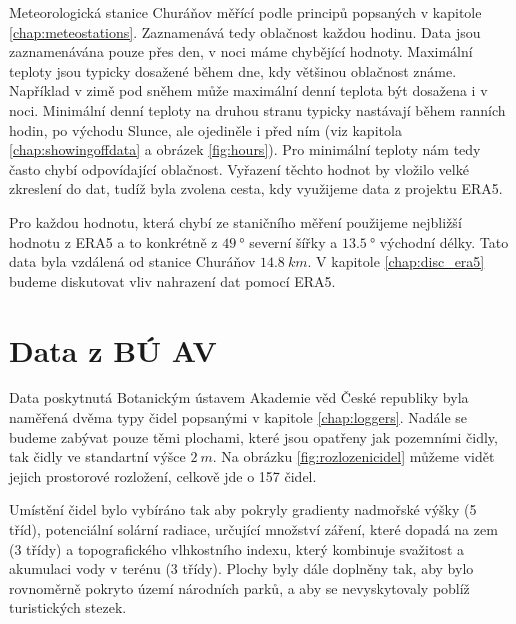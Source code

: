 Meteorologická stanice Churáňov měřící podle principů popsaných v kapitole \ref{chap:meteostations}. Zaznamenává tedy oblačnost každou hodinu. Data jsou zaznamenávána pouze přes den, v noci máme chybějící hodnoty. Maximální teploty jsou typicky dosažené během dne, kdy většinou oblačnost známe. Například v zimě pod sněhem může maximální denní teplota být dosažena i v noci. Minimální denní teploty na druhou stranu typicky nastávají během ranních hodin, po východu Slunce, ale ojediněle i před ním (viz kapitola \ref{chap:showingoffdata} a obrázek \ref{fig:hours}). Pro minimální teploty nám tedy často chybí odpovídající oblačnost. Vyřazení těchto hodnot by vložilo velké zkreslení do dat, tudíž byla zvolena cesta, kdy využijeme data z projektu ERA5.

Pro každou hodnotu, která chybí ze staničního měření použijeme nejbližší hodnotu z ERA5 a to konkrétně z $\SI{49}{\degree}$ severní šířky a $\SI{13.5}{\degree}$ východní délky. Tato data byla vzdálená od stanice Churáňov $\SI{14.8}{km}$. V kapitole \ref{chap:disc_era5} budeme diskutovat vliv nahrazení dat pomocí ERA5.

\section{Data z BÚ AV}\label{chap:data_buav}
Data poskytnutá Botanickým ústavem Akademie věd České republiky byla naměřená dvěma typy čidel popsanými v kapitole \ref{chap:loggers}. Nadále se budeme zabývat pouze těmi plochami, které jsou opatřeny jak pozemními čidly, tak čidly ve standartní výšce $\SI{2}{m}$. Na obrázku \ref{fig:rozlozenicidel} můžeme vidět jejich prostorové rozložení, celkově jde o 157 čidel. 

Umístění čidel bylo vybíráno tak aby pokryly gradienty nadmořské výšky (5 tříd), potenciální solární radiace, určující množství záření, které dopadá na zem (3 třídy) a topografického vlhkostního indexu, který kombinuje svažitost a akumulaci vody v terénu (3 třídy). Plochy byly dále doplněny tak, aby bylo rovnoměrně pokryto území národních parků, a aby se nevyskytovaly poblíž turistických stezek.

